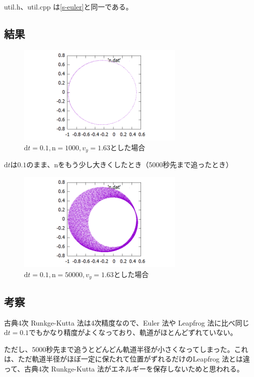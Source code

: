 \documentclass[a4paper,twoside]{jarticle}
\begin{document}
util.h、util.cpp は\ref{s-euler}と同一である。

\subsection{結果}
\begin{figure}[H]
\begin{center}
\includegraphics[width=8cm]{../cpp/out/runge-kutta/n.png}
\end{center}
\caption{$\mathrm{d}t=0.1, \mathrm{n}=1000, v_y=1.63$とした場合}
\end{figure}

$\mathrm{d}t$は$0.1$のまま、nをもう少し大きくしたとき（5000秒先まで追ったとき）

\begin{figure}[H]
\begin{center}
\includegraphics[width=8cm]{../cpp/out/runge-kutta/n_dt=e-1_n=50000.png}
\end{center}
\caption{$\mathrm{d}t=0.1, \mathrm{n}=50000, v_y=1.63$とした場合}
\end{figure}

\subsection{考察}
古典4次 Runkge-Kutta 法は4次精度なので、Euler 法や Leapfrog 法に比べ同じ$\mathrm{d}t=0.1$でもかなり精度がよくなっており、軌道がほとんどずれていない。

ただし、5000秒先まで追うとどんどん軌道半径が小さくなってしまった。これは、ただ軌道半径がほぼ一定に保たれて位置がずれるだけのLeapfrog 法とは違って、古典4次 Runkge-Kutta 法がエネルギーを保存しないためと思われる。
\end{document}
